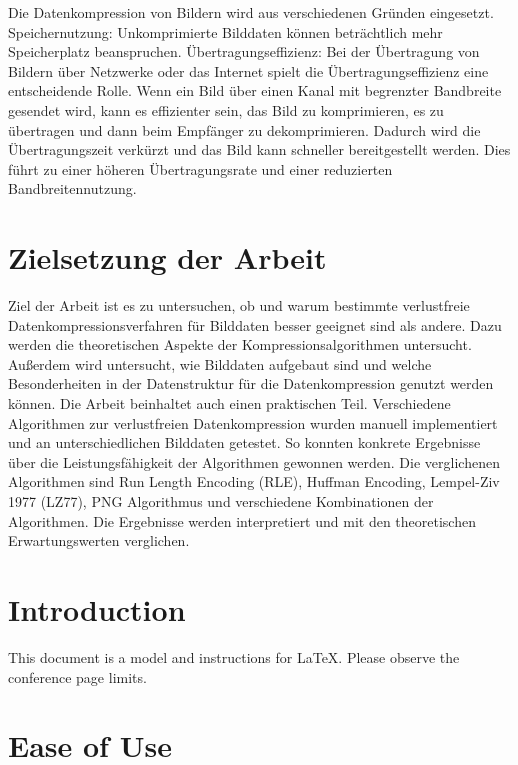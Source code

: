 \documentclass[conference]{IEEEtran}
\begin{document}
Die Datenkompression von Bildern wird aus verschiedenen Gründen eingesetzt. 
Speichernutzung: Unkomprimierte Bilddaten können beträchtlich mehr Speicherplatz beanspruchen. 
Übertragungseffizienz: Bei der Übertragung von Bildern über Netzwerke oder das Internet spielt 
die Übertragungseffizienz eine entscheidende Rolle. 
Wenn ein Bild über einen Kanal mit begrenzter Bandbreite gesendet wird, kann es effizienter 
sein, das Bild zu komprimieren, es zu übertragen und dann beim Empfänger zu dekomprimieren. 
Dadurch wird die Übertragungszeit verkürzt und das Bild kann schneller bereitgestellt werden.
Dies führt zu einer höheren Übertragungsrate und einer reduzierten Bandbreitennutzung.



\section{Zielsetzung der Arbeit}

Ziel der Arbeit ist es zu untersuchen, ob und warum bestimmte verlustfreie 
Datenkompressionsverfahren für Bilddaten besser geeignet sind als andere.
Dazu werden die theoretischen Aspekte der Kompressionsalgorithmen untersucht.
Außerdem wird untersucht, wie Bilddaten aufgebaut sind und welche Besonderheiten 
in der Datenstruktur für die Datenkompression genutzt werden können.
Die Arbeit beinhaltet auch einen praktischen Teil.
Verschiedene Algorithmen zur verlustfreien Datenkompression wurden manuell 
implementiert und an unterschiedlichen Bilddaten getestet.
So konnten konkrete Ergebnisse über die Leistungsfähigkeit der Algorithmen gewonnen werden.
Die verglichenen Algorithmen sind Run Length Encoding (RLE), Huffman Encoding, Lempel-Ziv 1977 (LZ77), 
PNG Algorithmus und verschiedene Kombinationen der Algorithmen. 
Die Ergebnisse werden interpretiert und mit den theoretischen Erwartungswerten verglichen.






\section{Introduction}
This document is a model and instructions for \LaTeX.
Please observe the conference page \cite{autor2023} limits. 

\section{Ease of Use}
\end{document}
